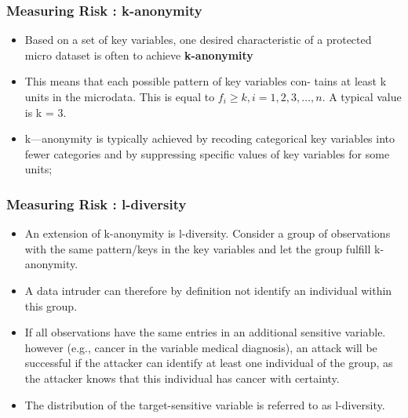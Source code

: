 \documentclass{beamer}
\begin{document}
	
	\begin{frame}
		\frametitle{Measuring Risk : k-anonymity}
		\begin{itemize}
		\item Based on a set of key variables, one desired characteristic of a protected micro
		dataset is often to achieve \textbf{k-anonymity} 
		\item This means that each possible pattern of key variables con-
		tains at least k units in the microdata. This is equal to $f_i \geq k, i=1,2,3,\ldots ,n$.  A
		typical value is k = 3.
		\item k—anonymity is typically achieved by recoding categorical key variables into fewer
		categories and by suppressing speciﬁc values of key variables for some units;
		\end{itemize}
	\end{frame}

	\begin{frame}
\frametitle{Measuring Risk : l-diversity}
\begin{itemize}	
	\item An extension of k-anonymity is l-diversity. Consider
		a group of observations with the same pattern/keys in the key variables and let
		the group fulfill k-anonymity. \item A data intruder can therefore by definition not
		identify an individual within this group. 
		\item If all observations have the same entries
		in an additional sensitive variable. however (e.g., cancer in the variable medical
		diagnosis), an attack will be successful if the attacker can identify at least one
		individual of the group, as the attacker knows that this individual has cancer
		with certainty. 
		\item The distribution of the target-sensitive variable is referred to as
		l-diversity.
		\end{itemize}
	\end{frame}
\end{document}
